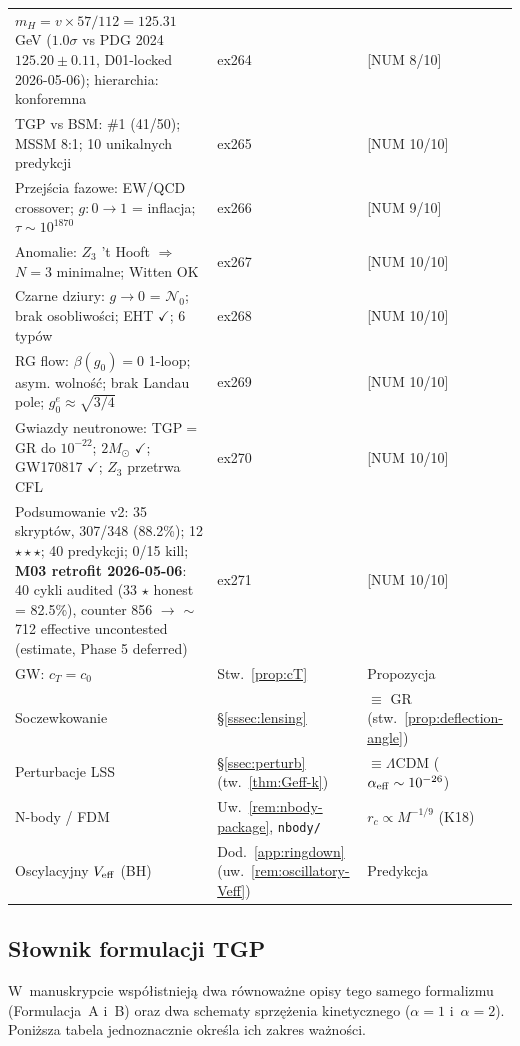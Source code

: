 \begin{center}
\begin{tabular}{@{}lll@{}}
$m_H = v\times 57/112 = 125.31$ GeV ($1.0\sigma$ vs PDG 2024 $125.20\pm0.11$, D01-locked 2026-05-06); hierarchia: konforemna & ex264 & [NUM 8/10] \\
TGP vs BSM: \#1 (41/50); MSSM 8:1; 10 unikalnych predykcji & ex265 & [NUM 10/10] \\
Przej\'scia fazowe: EW/QCD crossover; $g{:}0{\to}1$ = inflacja; $\tau\sim 10^{1870}$ & ex266 & [NUM 9/10] \\
Anomalie: $Z_3$ 't Hooft $\Rightarrow$ $N{=}3$ minimalne; Witten OK & ex267 & [NUM 10/10] \\
Czarne dziury: $g{\to}0$ = $\mathcal{N}_0$; brak osobliwo\'sci; EHT $\checkmark$; 6 typ\'ow & ex268 & [NUM 10/10] \\
RG flow: $\beta(g_0){=}0$ 1-loop; asym. wolno\'s\'c; brak Landau pole; $g_0^e{\approx}\sqrt{3/4}$ & ex269 & [NUM 10/10] \\
Gwiazdy neutronowe: TGP$=$GR do $10^{-22}$; $2M_\odot$ $\checkmark$; GW170817 $\checkmark$; $Z_3$ przetrwa CFL & ex270 & [NUM 10/10] \\
Podsumowanie v2: 35 skrypt\'ow, 307/348 (88.2\%); 12 $\star\star\star$; 40 predykcji; 0/15 kill; \textbf{M03 retrofit 2026-05-06}: 40 cykli audited (33 $\star$ honest = 82.5\%), counter 856 $\to$ $\sim$712 effective uncontested (estimate, Phase 5 deferred) & ex271 & [NUM 10/10] \\
GW: $c_T = c_0$ & Stw.~\ref{prop:cT} & Propozycja \\
Soczewkowanie & \S\ref{sssec:lensing} & $\equiv$ GR (stw.~\ref{prop:deflection-angle}) \\
Perturbacje LSS & \S\ref{ssec:perturb} (tw.~\ref{thm:Geff-k}) & $\equiv \Lambda$CDM ($\alpha_{\rm eff} \sim 10^{-26}$) \\
N-body / FDM & Uw.~\ref{rem:nbody-package}, \texttt{nbody/} & $r_c \propto M^{-1/9}$ (K18) \\
Oscylacyjny $V_{\rm eff}$ (BH) & Dod.~\ref{app:ringdown} (uw.~\ref{rem:oscillatory-Veff}) & Predykcja \\
\bottomrule
\end{tabular}
\end{center}

\subsection*{S\l{}ownik formulacji TGP}

W~manuskrypcie wsp\'o\l{}istniej\k{a} dwa r\'ownowa\.zne opisy
tego samego formalizmu (Formulacja~A i~B) oraz dwa schematy
sprz\k{e}\.zenia kinetycznego ($\alpha = 1$ i~$\alpha = 2$).
Poni\.zsza tabela jednoznacznie okre\'sla ich zakres wa\.zno\'sci.

